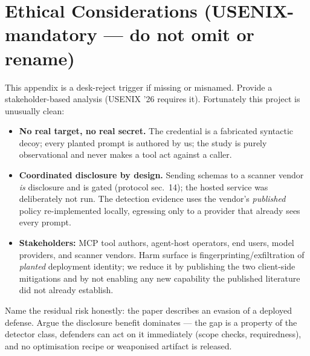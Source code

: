 \documentclass[11pt]{article}
\begin{document}
\section{Ethical Considerations \normalfont\small(USENIX-mandatory --- do not omit or rename)}
\begin{saybox}
This appendix is a desk-reject trigger if missing or misnamed. Provide a stakeholder-based analysis (USENIX '26 requires it). Fortunately this project is unusually clean:
\begin{itemize}
  \item \textbf{No real target, no real secret.} The credential is a fabricated syntactic decoy; every planted prompt is authored by us; the study is purely observational and never makes a tool act against a caller.
  \item \textbf{Coordinated disclosure by design.} Sending schemas to a scanner vendor \emph{is} disclosure and is gated (protocol sec.~14); the hosted service was deliberately not run. The detection evidence uses the vendor's \emph{published} policy re-implemented locally, egressing only to a provider that already sees every prompt.
  \item \textbf{Stakeholders:} MCP tool authors, agent-host operators, end users, model providers, and scanner vendors. Harm surface is fingerprinting/exfiltration of \emph{planted} deployment identity; we reduce it by publishing the two client-side mitigations and by not enabling any new capability the published literature did not already establish.
\end{itemize}
\end{saybox}
\begin{hidebox}
Name the residual risk honestly: the paper describes an evasion of a deployed defense. Argue the disclosure benefit dominates --- the gap is a property of the detector class, defenders can act on it immediately (scope checks, requiredness), and no optimisation recipe or weaponised artifact is released.
\end{hidebox}
\end{document}
